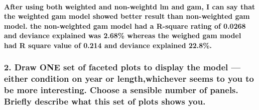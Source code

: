 \documentclass[
]{article}
\begin{document}
\hypertarget{after-using-both-weighted-and-non-weightd-lm-and-gam-i-can-say-that-the-weighted-gam-model-showed-better-result-than-non-weighted-gam-model.-the-non-weighted-gam-model-had-a-r-square-rating-of-0.0268-and-deviance-explained-was-2.68-whereas-the-weighed-gam-model-had-r-square-value-of-0.214-and-deviance-explained-22.8.}{%
\paragraph{After using both weighted and non-weightd lm and gam, I can
say that the weighted gam model showed better result than non-weighted
gam model. the non-weighted gam model had a R-square rating of 0.0268
and deviance explained was 2.68\% whereas the weighed gam model had R
square value of 0.214 and deviance explained
22.8\%.}\label{after-using-both-weighted-and-non-weightd-lm-and-gam-i-can-say-that-the-weighted-gam-model-showed-better-result-than-non-weighted-gam-model.-the-non-weighted-gam-model-had-a-r-square-rating-of-0.0268-and-deviance-explained-was-2.68-whereas-the-weighed-gam-model-had-r-square-value-of-0.214-and-deviance-explained-22.8.}}

\hypertarget{draw-one-set-of-faceted-plots-to-display-the-model-either-condition-on-year-or-lengthwhichever-seems-to-you-to-be-more-interesting.-choose-a-sensible-number-of-panels.-briefly-describe-what-this-set-of-plots-shows-you.}{%
\subsubsection{2. Draw ONE set of faceted plots to display the model ---
either condition on year or length,whichever seems to you to be more
interesting. Choose a sensible number of panels. Briefly describe what
this set of plots shows
you.}\label{draw-one-set-of-faceted-plots-to-display-the-model-either-condition-on-year-or-lengthwhichever-seems-to-you-to-be-more-interesting.-choose-a-sensible-number-of-panels.-briefly-describe-what-this-set-of-plots-shows-you.}}
\end{document}
